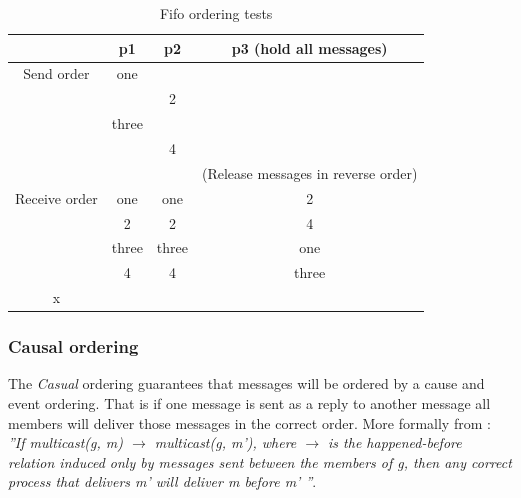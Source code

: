 \documentclass[titlepage, twocolumn, a4paper, 10pt]{article}
\begin{document}
\begin{table}[H]
  \centering
  \begin{footnotesize}
    \begin{tabular} {c | c | c | c}
      & p1 & p2 & p3 (hold all messages) \\
      \hline
      Send order & one &  &  \\
      &  & 2 &  \\
      & three &  &  \\
      &  & 4 &  \\
      \hline
      &  &  & (Release messages in reverse order) \\
      \hline
      Receive order & one & one & 2 \\
      & 2 & 2 & 4 \\
      & three & three & one \\
      & 4 & 4 & three \\
      x    \end{tabular}
  \end{footnotesize}
  \caption{Fifo ordering tests}
  \label{tbl:fifo}
\end{table}

\subsubsection{Causal ordering}\label{sec:causal}
The \textit{Casual} ordering guarantees that messages will be ordered
by a cause and event ordering. That is if one message is sent as a
reply to another message all members will deliver those messages in
the correct order. More formally from \cite{book:dist-syst}:
\textit{''If multicast(g, m) $\rightarrow$ multicast(g, m'), where
  $\rightarrow$ is the happened-before relation induced only by
  messages sent between the members of g, then any correct process
  that delivers m' will deliver m before m' ''}.
\end{document}

